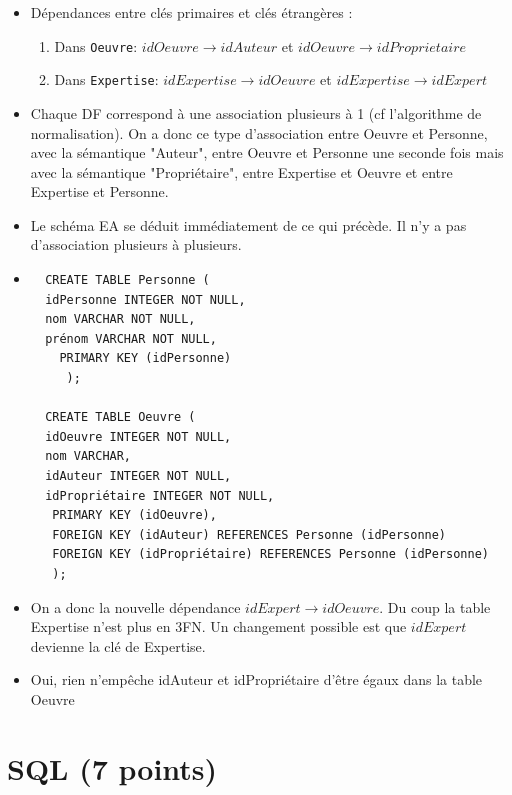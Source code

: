 \begin{solution}


\begin{itemize}
\item Dépendances entre clés primaires et clés étrangères :
   \begin{enumerate}
      \item Dans \texttt{Oeuvre}: $idOeuvre \to idAuteur$ et $idOeuvre \to idProprietaire$
       \item Dans \texttt{Expertise}: $idExpertise \to idOeuvre$ et $idExpertise \to idExpert$
  \end{enumerate}
   \item Chaque DF correspond à une association plusieurs à 1 (cf l'algorithme de normalisation). 
       On a donc ce type d'association entre Oeuvre et Personne, avec la sémantique "Auteur",
       entre Oeuvre et Personne une seconde fois mais avec la sémantique "Propriétaire",
         entre Expertise et Oeuvre et entre Expertise et Personne.
        \item Le schéma EA se déduit immédiatement de ce qui précède. Il n'y a pas d'association
        plusieurs à plusieurs.

 \item
  \begin{verbatim}
  CREATE TABLE Personne (
  idPersonne INTEGER NOT NULL,
  nom VARCHAR NOT NULL,
  prénom VARCHAR NOT NULL,
    PRIMARY KEY (idPersonne)
     );
   
  CREATE TABLE Oeuvre (
  idOeuvre INTEGER NOT NULL,
  nom VARCHAR,
  idAuteur INTEGER NOT NULL,
  idPropriétaire INTEGER NOT NULL,
   PRIMARY KEY (idOeuvre),
   FOREIGN KEY (idAuteur) REFERENCES Personne (idPersonne) 
   FOREIGN KEY (idPropriétaire) REFERENCES Personne (idPersonne) 
   );
  \end{verbatim}
  
  \item On a donc la nouvelle dépendance $idExpert \to idOeuvre$. Du coup la table Expertise
      n'est plus en 3FN. Un changement possible est que $idExpert$ devienne la clé
      de Expertise. 
      \item Oui, rien n'empêche  idAuteur et idPropriétaire d'être égaux dans la table Oeuvre
\end{itemize}
\end{solution}


\section{SQL (7 points)}

